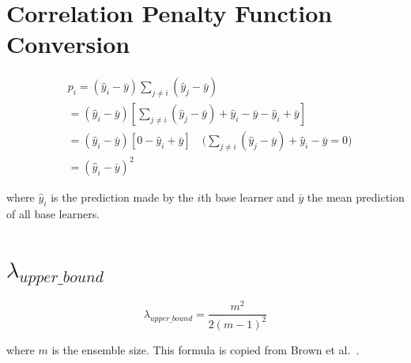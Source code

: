 \documentclass{article}
\begin{document}
\section{Correlation Penalty Function Conversion}
\label{appendix:correlation_penalty_function_conversion}
\begin{align*}
    &p_i = (\hat{y}_i - \bar{y}) \sum_{j \neq i} (\hat{y}_j - \bar{y})
    \\
    &= (\hat{y}_i - \bar{y}) \left[\sum_{j \neq i} (\hat{y}_j - \bar{y}) + \hat{y}_i - \bar{y} - \hat{y}_i + \bar{y}\right]
    \\
    &= (\hat{y}_i - \bar{y}) \left[0 - \hat{y}_i + \bar{y}\right] \quad \text{(}\sum_{j \neq i} (\hat{y}_j - \bar{y}) + \hat{y}_i - \bar{y} = 0\text{)}
    \\
    &= (\hat{y}_i - \bar{y})^2
\end{align*}
\begin{center}
    \begin{minipage}{0.8\linewidth}
        \small
        where $\hat{y}_i$ is the prediction made by the $i$th base learner and  
        $\bar{y}$ the mean prediction of all base learners. 
    \end{minipage}
\end{center}


\section{$\lambda_{upper\_bound}$}
\label{appendix:lambda_upper_bound}
\[
\lambda_{upper\_bound} = \frac{m^2}{2(m - 1)^2}
\]
\begin{center}
    \begin{minipage}{0.8\linewidth}
        \small
        where $m$ is the ensemble size. This formula is copied from Brown et al.\ \cite{brown2005managing}. 
    \end{minipage}
\end{center}
\end{document}

